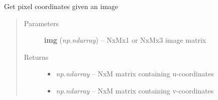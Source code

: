 \documentclass[letterpaper,10pt,english]{sphinxmanual}
\begin{document}
\begin{fulllineitems}
\label{rectification:flamingo.rectification.rectification.get_pixel_coordinates}
Get pixel coordinates given an image
\begin{quote}\begin{description}
\item[{Parameters}] \leavevmode
\textbf{img} (\emph{np.ndarray}) -- NxMx1 or NxMx3 image matrix

\item[{Returns}] \leavevmode
\begin{itemize}
\item {} 
\emph{np.ndarray} --
NxM matrix containing u-coordinates

\item {} 
\emph{np.ndarray} --
NxM matrix containing v-coordinates

\end{itemize}


\end{description}\end{quote}

\end{fulllineitems}

\end{document}
